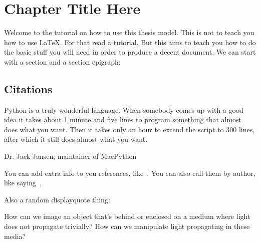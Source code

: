 
\chapter{Chapter Title Here}


\label{ChapterTemplate}


Welcome to the tutorial on how to use this thesis model. This is not to teach
you how to use \LaTeX. For that read a tutorial. But this aims to teach you how
to do the basic stuff you will need in order to produce a decent document.
We can start with a section and a section epigraph:

\section{Citations}
\epigraph{Python is a truly wonderful language. When somebody comes up with a good idea it takes about 1 minute and five lines to program something that almost does what you want. Then it takes only an hour to extend the script to 300 lines, after which it still does almost what you want.}{Dr. Jack Jansen,  maintainer of MacPython}

You can add extra info to you references, like~\cite[section 3]{Fienup1982}. You
can also call them by author, like saying~\citet{Fienup1982}.

Also a random displayquote thing:

\begin{displayquote}
    How can we image an object that's behind or enclosed on a medium where light does not propagate trivially? How can we manipulate light propagating in these media?
\end{displayquote}

